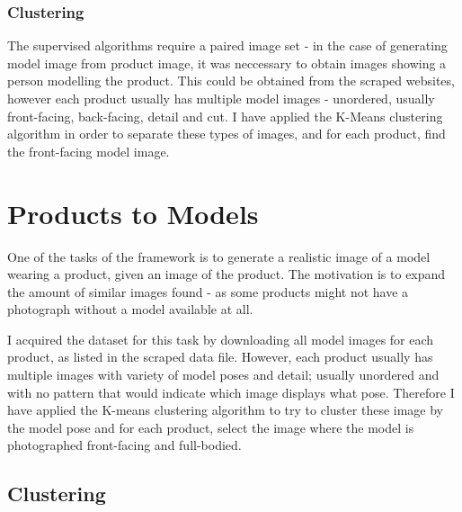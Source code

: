 \documentclass{article}
\begin{document}
\subsubsection{Clustering}
The supervised algorithms require a paired image set - in the case of generating model image from product image, it was neccessary to obtain images showing a person modelling the product. This could be obtained from the scraped websites, however each product usually has multiple model images - unordered, usually front-facing, back-facing, detail and cut. I have applied the K-Means clustering algorithm in order to separate these types of images, and for each product, find the front-facing model image.


\section{Products to Models}
One of the tasks of the framework is to generate a realistic image of a model wearing a product, given an image of the product. The motivation is to expand the amount of similar images found - as some products might not have a photograph without a model available at all.

I acquired the dataset for this task by downloading all model images for each product, as listed in the scraped data file. However, each product usually has multiple images with variety of model poses and detail; usually unordered and with no pattern that would indicate which image displays what pose. Therefore I have applied the K-means clustering algorithm to try to cluster these image by the model pose and for each product, select the image where the model is photographed front-facing and full-bodied.

\subsection{Clustering}



\newpage


\end{document}
